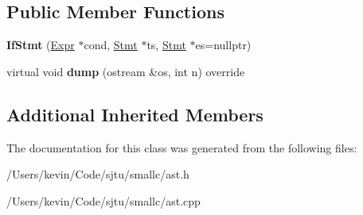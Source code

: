 \subsection*{Public Member Functions}
\begin{DoxyCompactItemize}
\item 
\mbox{\label{class_if_stmt_a67184c90f8121a9d37e2425869cad659}} 
{\bfseries If\+Stmt} (\hyperlink{class_expr}{Expr} $\ast$cond, \hyperlink{class_stmt}{Stmt} $\ast$ts, \hyperlink{class_stmt}{Stmt} $\ast$es=nullptr)
\item 
\mbox{\label{class_if_stmt_a439420ca9fd3c58fa6830292bb63c886}} 
virtual void {\bfseries dump} (ostream \&os, int n) override
\end{DoxyCompactItemize}
\subsection*{Additional Inherited Members}


The documentation for this class was generated from the following files\+:\begin{DoxyCompactItemize}
\item 
/\+Users/kevin/\+Code/sjtu/smallc/ast.\+h\item 
/\+Users/kevin/\+Code/sjtu/smallc/ast.\+cpp\end{DoxyCompactItemize}
